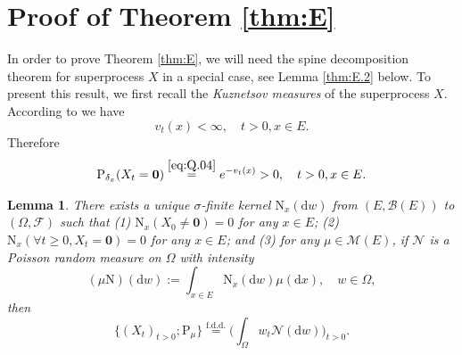 \documentclass[12pt,a4paper]{amsart}
\numberwithin{equation}{section}
\theoremstyle{plain}
\newtheorem{lem}[thm]{Lemma}
\theoremstyle{definition}
\theoremstyle{remark}
\begin{document}
\section{Proof of Theorem \ref{thm:E}} \label{sec:E}
	In order to prove Theorem \ref{thm:E}, we will need 
the spine decomposition theorem for superprocess $X$ in a special case, see Lemma \ref{thm:E.2} below.	
	To present this result, we first recall the \emph{Kuznetsov  measures} of the superprocess $X$.
	According to \cite[Proposition 2.1]{LiuRenSongSun2020}  
	we have 
\begin{equation} \label{eq:E.05}
	v_t(x)<\infty, \quad t>0, x\in E.
\end{equation}
	Therefore
\begin{align}
	\mathrm P_{\delta_x}(X_t = \mathbf 0) \overset{\eqref{eq:Q.04}}
	= e^{-v_t(x)} > 0, \quad t>0, x\in E.
\end{align}
\begin{lem}
	There exists a unique $\sigma$-finite kernel $\mathrm N_x(\mathrm dw)$ from $(E,\mathscr B(E))$ to $(\Omega, \mathscr F)$ such that 
	(1) $\mathrm N_x(X_0 \neq \mathbf 0) = 0$ for any $x\in E$;
	(2) $\mathrm N_x (\forall t \geq 0, X_t =\mathbf 0) =0$ for any $x\in E$;
	and (3) for any $\mu \in \mathcal M(E)$, if $\mathcal N$ is a Poisson random measure on $\Omega$ with intensity
\[
	(\mu\mathrm N)(\mathrm dw):=
	\int_{x\in E} \mathrm N_x(\mathrm dw)\mu(\mathrm dx), 
	\quad w\in \Omega,
\]
	then
\begin{equation}
	\{(X_t)_{t> 0};\mathrm P_\mu\}
	\overset{\text{f.d.d.}}= \Big(\int_{\Omega} w_t\mathcal N(\mathrm dw)\Big)_{t> 0}.
\end{equation}
\end{lem}
\end{document}
